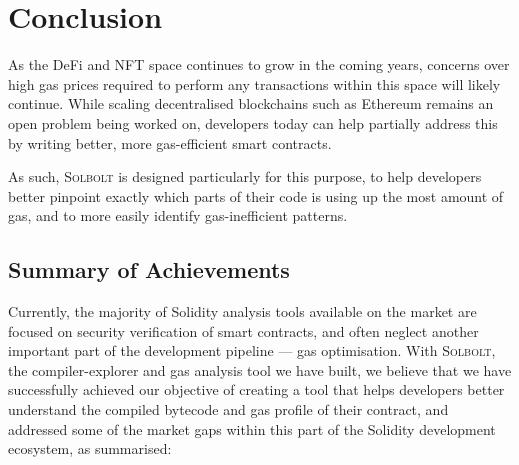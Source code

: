 \chapter{Conclusion}
\label{chap:conclusion}

As the DeFi and NFT space continues to grow in the coming years, concerns over high gas prices
required to perform any transactions within this space will likely continue. While scaling
decentralised blockchains such as Ethereum remains an open problem being worked on, developers
today can help partially address this by writing better, more gas-efficient smart contracts.

As such, \textcolor{NavyBlue}{\textsc{Solbolt}} is designed particularly for this purpose, to help developers better pinpoint
exactly which parts of their code is using up the most amount of gas, and to more easily identify
gas-inefficient patterns.

\section{Summary of Achievements}

Currently, the majority of Solidity analysis tools available on the market are focused on 
security verification of smart contracts, and often neglect another important part of the
development pipeline --- gas optimisation.
With \textcolor{NavyBlue}{\textsc{Solbolt}}, the compiler-explorer and gas analysis tool we have built, we believe that
we have successfully achieved our objective of creating a tool that helps developers 
better understand the compiled bytecode and gas profile of their contract, and addressed some of the market gaps within this part of the Solidity
development ecosystem, as summarised:


